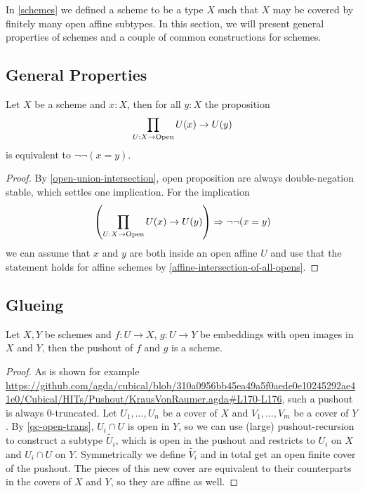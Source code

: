 In \cref{schemes} we defined a scheme to be a type $X$ such that $X$
may be covered by finitely many open affine subtypes.
In this section, we will present general properties of schemes and a couple of common constructions for schemes.


\subsection{General Properties}

\begin{lemma}%
  \label{intersection-of-all-opens}
  Let $X$ be a scheme and $x:X$, then for all $y:X$ the proposition
  \[ \prod_{U:X\to \mathrm{Open}}U(x)\to U(y) \]
  is equivalent to $\neg\neg (x=y)$.
\end{lemma}

\begin{proof}
  By \cref{open-union-intersection},
  open proposition are always double-negation stable,
  which settles one implication.
  For the implication
  \[ \left(\prod_{U:X\to \mathrm{Open}}U(x)\to U(y)\right) \Rightarrow \neg\neg (x=y) \]
  we can assume that $x$ and $y$ are both inside an open affine $U$
  and use that the statement holds for affine schemes by \cref{affine-intersection-of-all-opens}.
\end{proof}

\subsection{Glueing}

\begin{proposition}%
  Let $X,Y$ be schemes and $f:U\to X$, $g:U\to Y$ be embeddings with open images in $X$ and $Y$,
  then the pushout of $f$ and $g$ is a scheme.
\end{proposition}

\begin{proof}
  As is shown for example \href{here}{https://github.com/agda/cubical/blob/310a0956bb45ea49a5f0aede0e10245292ae41e0/Cubical/HITs/Pushout/KrausVonRaumer.agda#L170-L176},
  such a pushout is always 0-truncated.
  Let $U_1,\dots,U_n$ be a cover of $X$ and $V_1,\dots,V_m$ be a cover of $Y$.
  By \cref{qc-open-trans}, $U_i\cap U$ is open in $Y$,
  so we can use (large) pushout-recursion to construct a subtype $\tilde{U_i}$,
  which is open in the pushout and restricts to $U_i$ on $X$ and $U_i\cap U$ on $Y$.
  Symmetrically we define $\tilde{V_i}$ and in total get an open finite cover of the pushout.
  The pieces of this new cover are equivalent to their counterparts in the covers of $X$ and $Y$,
  so they are affine as well.
\end{proof}

